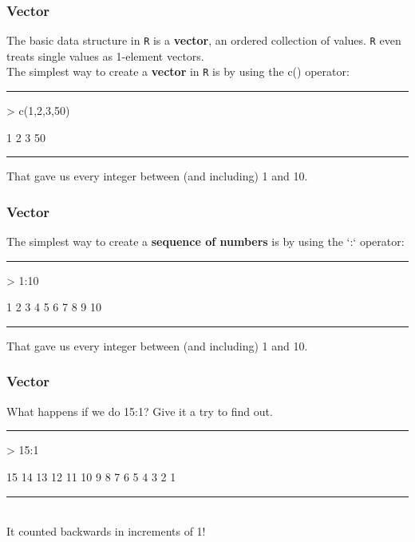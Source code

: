 \documentclass{beamer}
\begin{document}
\begin{frame}[fragile]
	\frametitle{Vector}
	The basic data structure in \texttt{R} is a \textbf{vector}, an ordered collection of values. \texttt{R} even treats single values as 1-element vectors.\\
	The simplest way to create a \textbf{vector} in \texttt{R} is by using the c() operator:
	\rule{\textwidth}{0.4pt}
\begin{Schunk}
\begin{Sinput}
> c(1,2,3,50)
\end{Sinput}
\begin{Soutput}
[1]  1  2  3 50
\end{Soutput}
\end{Schunk}
\rule{\textwidth}{0.4pt}
\vspace{20pt}
That gave us every integer between (and including) 1 and 10.
\end{frame}

\begin{frame}[fragile]
	\frametitle{Vector}
	The simplest way to create a \textbf{sequence of numbers} is by using the `:` operator:
	\rule{\textwidth}{0.4pt}
\begin{Schunk}
\begin{Sinput}
> 1:10
\end{Sinput}
\begin{Soutput}
 [1]  1  2  3  4  5  6  7  8  9 10
\end{Soutput}
\end{Schunk}
\rule{\textwidth}{0.4pt}
\vspace{20pt}
That gave us every integer between (and including) 1 and 10.
\end{frame}

\begin{frame}[fragile]
	\frametitle{Vector}
	What happens if we do 15:1? Give it a try to find out.
	\pause
	\rule{\textwidth}{0.4pt}
\begin{Schunk}
\begin{Sinput}
> 15:1
\end{Sinput}
\begin{Soutput}
 [1] 15 14 13 12 11 10  9  8  7  6  5  4  3  2  1
\end{Soutput}
\end{Schunk}
\rule{\textwidth}{0.4pt}\\
\vspace{20pt}
It counted backwards in increments of 1!
\end{frame}
\end{document}
